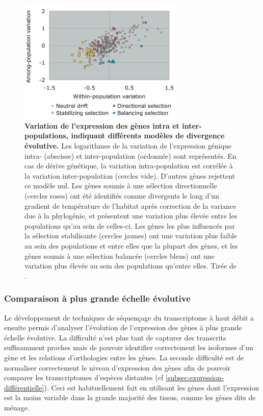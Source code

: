 \begin{figure}[h]
 \centering
 \includegraphics[width=0.7\textwidth, page=1] {figures/introduction/fig25.png}
 \caption[Variation de l'expression des gènes intra et inter-populations, indiquant différents modèles de divergence évolutive.]{
 \textbf{Variation de l'expression des gènes intra et inter-populations, indiquant différents modèles de divergence évolutive.}
 Les logarithmes de la variation de l'expression génique intra- (abscisse) et inter-population (ordonnée) sont représentés. En cas de dérive génétique, la variation intra-population est corrélée à la variation inter-population (cercles vide). D'autres gènes rejettent ce modèle nul. Les gènes soumis à une sélection directionnelle (cercles roses) ont été identifiés comme divergents le long d'un gradient de température de l'habitat après correction de la variance due à la phylogénie, et présentent une variation plus élevée entre les populations qu'au sein de celles-ci. Les gènes les plus influencés par la sélection stabilisante (cercles jaunes) ont une variation plus faible au sein des populations et entre elles que la plupart des gènes, et les gènes soumis à une sélection balancée (cercles bleus) ont une variation plus élevée au sein des populations qu'entre elles. Tirée de \citet{whitehead_neutral_2006}.\\
 }
 \label{fig:Fig25}
\end{figure} 

\subsubsection{Comparaison à plus grande échelle évolutive}
\label{subsec:comp-grande-echelle}

Le développement de techniques de séquençage du \gls{transcriptome} à haut débit a ensuite permis d’analyser l’évolution de l’expression des gènes à plus grande échelle évolutive. La difficulté n’est plus tant de capturer des transcrits suffisamment proches mais de pouvoir identifier correctement les isoformes d’un gène et les relations d’orthologies entre les gènes. La seconde difficulté est de normaliser correctement le niveau d’expression des gènes afin de pouvoir comparer les \glspl{transcriptome} d’espèces distantes (cf \ref{subsec:expression-différentielle}). Ceci est habituellement fait en utilisant les gènes dont l’expression est la moins variable dans la grande majorité des tissus, comme les gènes dits de ménage. 

